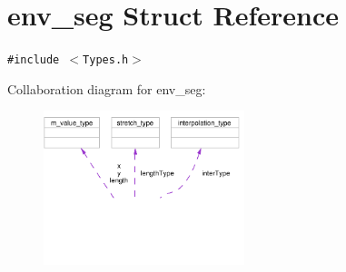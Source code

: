 \hypertarget{structenv__seg}{
\section{env\_\-seg Struct Reference}
\label{structenv__seg}
}
{\tt \#include $<$Types.h$>$}

Collaboration diagram for env\_\-seg:\begin{figure}[H]
\begin{center}
\leavevmode
\includegraphics[width=166pt]{structenv__seg__coll__graph}
\end{center}
\end{figure}
